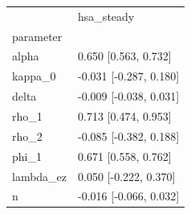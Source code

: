 \begin{tabular}{ll}
\toprule
 & hsa\_steady \\
parameter &  \\
\midrule
alpha & 0.650 [0.563, 0.732] \\
kappa\_0 & -0.031 [-0.287, 0.180] \\
delta & -0.009 [-0.038, 0.031] \\
rho\_1 & 0.713 [0.474, 0.953] \\
rho\_2 & -0.085 [-0.382, 0.188] \\
phi\_1 & 0.671 [0.558, 0.762] \\
lambda\_ez & 0.050 [-0.222, 0.370] \\
n & -0.016 [-0.066, 0.032] \\
\bottomrule
\end{tabular}
